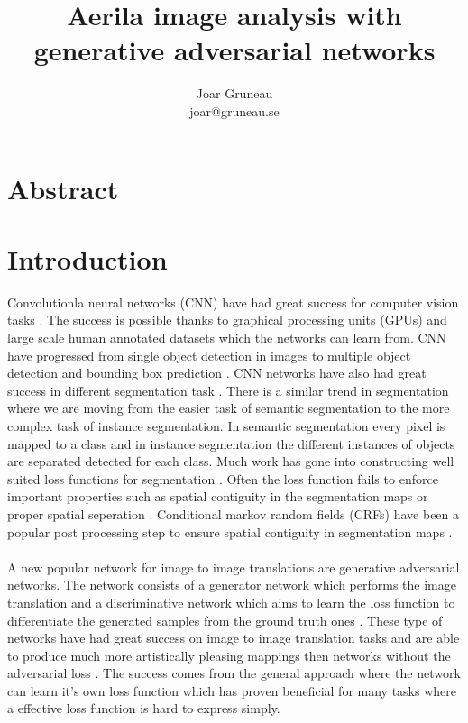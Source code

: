 \documentclass[a4paper,11pt]{article}
\title{Aerila image analysis with generative adversarial networks}
\author{Joar Gruneau \\ joar@gruneau.se}
\affil{}
\begin{document}
\maketitle
\newpage
\section{Abstract}
\section{Introduction}
Convolutionla neural networks (CNN) have had great success for computer vision tasks \cite{sermanet_overfeat:_2013, zeiler_visualizing_2013, simonyan_two-stream_2014, krizhevsky_imagenet_2012}. The success is possible thanks to graphical processing units (GPUs) and large scale human annotated datasets which  the networks can learn from. CNN have progressed from single object detection in images \cite{krizhevsky_learning_2009} to multiple object detection and bounding box prediction \cite{lin_microsoft_2014}. CNN networks have also had great success in different segmentation task \cite{garcia-garcia_review_2017}. There is a similar trend in segmentation where we are moving from the easier task of semantic segmentation to the more complex task of instance segmentation. In semantic segmentation every pixel is mapped to a class and in instance segmentation the different instances of objects are separated detected for each class. Much work has gone into constructing well suited loss functions for segmentation \cite{ronneberger_u-net:_2015, yu_unitbox:_2016, rahman_optimizing_2016}. Often the loss function fails to enforce important properties such as spatial contiguity in the segmentation maps \cite{luc_semantic_2016} or proper spatial seperation \cite{audebert_segment-before-detect:_2017}. Conditional markov random fields (CRFs) have been a popular post processing step to ensure spatial contiguity in segmentation maps \cite{zhao_classification_2007}.\\
\\
A new popular network for image to image translations are generative adversarial networks. The network consists of a generator network which performs the image translation and a discriminative network which aims to learn the loss function to differentiate the generated samples from the ground truth ones \cite{goodfellow_nips_2016}. These type of networks have had great success on image to image translation tasks and are able to produce much more artistically pleasing mappings then networks without the adversarial loss \cite{ledig_photo-realistic_2016, isola_image--image_2016}. The success comes from the general approach where the network can learn it's own loss function which has proven beneficial for many tasks where a effective loss function is hard to express simply.\\
\end{document}
